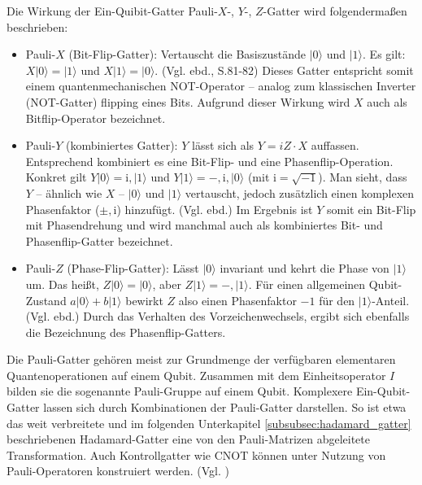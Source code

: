 Die Wirkung der Ein-Quibit-Gatter Pauli-$X$-, $Y$-, $Z$-Gatter wird folgendermaßen beschrieben:



\begin{itemize}
\item Pauli-$X$ (Bit-Flip-Gatter): Vertauscht die Basiszustände $|0\rangle$ und $|1\rangle$. Es gilt: $X|0\rangle = |1\rangle$ und $X|1\rangle = |0\rangle$. (Vgl. ebd., S.81-82) Dieses Gatter entspricht somit einem quantenmechanischen NOT-Operator – analog zum klassischen Inverter (NOT-Gatter) flipping eines Bits. Aufgrund dieser Wirkung wird $X$ auch als Bitflip-Operator bezeichnet. 

\item Pauli-$Y$ (kombiniertes Gatter): $Y$ lässt sich als $Y = iZ \cdot X$ auffassen. Entsprechend kombiniert es eine Bit-Flip- und eine Phasenflip-Operation. Konkret gilt $Y|0\rangle = \mathrm{i},|1\rangle$ und $Y|1\rangle = -,\mathrm{i},|0\rangle$ (mit $\mathrm{i}=\sqrt{-1}$). Man sieht, dass $Y$ – ähnlich wie $X$ – $|0\rangle$ und $|1\rangle$ vertauscht, jedoch zusätzlich einen komplexen Phasenfaktor ($\pm,\mathrm{i}$) hinzufügt. (Vgl. ebd.) Im Ergebnis ist $Y$ somit ein Bit-Flip mit Phasendrehung und wird manchmal auch als kombiniertes Bit- und Phasenflip-Gatter bezeichnet.

\item Pauli-$Z$ (Phase-Flip-Gatter): Lässt $|0\rangle$ invariant und kehrt die Phase von $|1\rangle$ um. Das heißt, $Z|0\rangle = |0\rangle$, aber $Z|1\rangle = -,|1\rangle$. Für einen allgemeinen Qubit-Zustand $a|0\rangle + b|1\rangle$ bewirkt $Z$ also einen Phasenfaktor $-1$ für den $|1\rangle$-Anteil. (Vgl. ebd.) Durch das Verhalten des Vorzeichenwechsels, ergibt sich ebenfalls die Bezeichnung des Phasenflip-Gatters.

\end{itemize}

Die Pauli-Gatter gehören meist zur Grundmenge der verfügbaren elementaren Quantenoperationen auf einem Qubit. Zusammen mit dem Einheitsoperator $I$ bilden sie die sogenannte Pauli-Gruppe auf einem Qubit. Komplexere Ein-Qubit-Gatter lassen sich durch Kombinationen der Pauli-Gatter darstellen. So ist etwa das weit verbreitete und im folgenden Unterkapitel \ref{subsubsec:hadamard_gatter} beschriebenen Hadamard-Gatter eine von den Pauli-Matrizen abgeleitete Transformation. Auch Kontrollgatter wie CNOT können unter Nutzung von Pauli-Operatoren konstruiert werden. (Vgl. \cite[S.312]{wekesa_sirengo_mathematical_2024})


